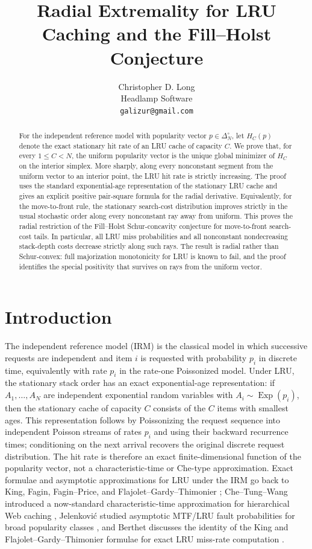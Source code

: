 \documentclass[11pt]{article}
\title{Radial Extremality for LRU Caching and the Fill--Holst Conjecture}
\author{Christopher D. Long\\
Headlamp Software\\
\texttt{galizur@gmail.com}}
\date{}
\theoremstyle{remark}
\newcommand{\Exp}{\operatorname{Exp}}
\begin{document}
\maketitle

\begin{abstract}
For the independent reference model with popularity vector
$p\in\Delta_N^\circ$, let $H_C(p)$ denote the exact stationary hit rate
of an LRU cache of capacity $C$.  We prove that, for every $1\le C<N$,
the uniform popularity vector is the unique global minimizer of $H_C$ on
the interior simplex.  More sharply, along every nonconstant segment from
the uniform vector to an interior point, the LRU hit rate is strictly
increasing.  The proof uses the standard exponential-age representation
of the stationary LRU cache and gives an explicit positive pair-square
formula for the radial derivative.  Equivalently, for the move-to-front
rule, the stationary search-cost distribution improves strictly in the
usual stochastic order along every nonconstant ray away from uniform.
This proves the radial restriction of the Fill--Holst Schur-concavity
conjecture for move-to-front search-cost tails.  In particular, all LRU
miss probabilities and all nonconstant nondecreasing stack-depth costs
decrease strictly along such rays.  The result is radial
rather than Schur-convex: full majorization monotonicity for LRU is known
to fail, and the proof identifies the special positivity that survives on
rays from the uniform vector.
\end{abstract}

\section{Introduction}

The independent reference model (IRM) is the classical model in which
successive requests are independent and item $i$ is requested with
probability $p_i$ in discrete time, equivalently with rate $p_i$ in the
rate-one Poissonized model.  Under LRU, the stationary stack order has an
exact exponential-age representation: if $A_1,\ldots,A_N$ are independent
exponential random variables with $A_i\sim\Exp(p_i)$, then the stationary
cache of capacity $C$ consists of the $C$ items with smallest ages.  This
representation follows by Poissonizing the request sequence into
independent Poisson streams of rates $p_i$ and using their backward
recurrence times; conditioning on the next arrival recovers the original
discrete request distribution.  The hit rate is therefore an exact
finite-dimensional function of the popularity vector, not a
characteristic-time or Che-type approximation.
Exact formulae and asymptotic approximations for LRU under the IRM go
back to King, Fagin, Fagin--Price, and Flajolet--Gardy--Thimonier
\cite{King1971,Fagin1977,FaginPrice1978,FlajoletGardyThimonier1992};
Che--Tung--Wang introduced a now-standard characteristic-time
approximation for hierarchical Web caching \cite{CheTungWang2002},
Jelenkovi\'c studied asymptotic MTF/LRU fault probabilities for broad
popularity classes \cite{Jelenkovic1999}, and Berthet discusses the
identity of the King and Flajolet--Gardy--Thimonier formulae for exact
LRU miss-rate computation \cite{Berthet2016}.
\end{document}
